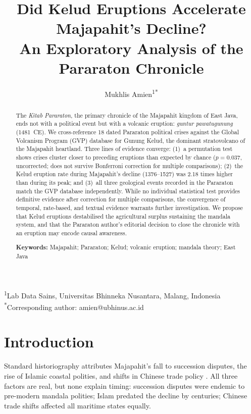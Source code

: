 \documentclass[12pt,a4paper]{article}
\title{\textbf{Did Kelud Eruptions Accelerate Majapahit's Decline?\\An Exploratory Analysis of the Pararaton Chronicle}}
\author{Mukhlis Amien\textsuperscript{1*}}
\date{}
\begin{document}
\maketitle

\noindent\textsuperscript{1}Lab Data Sains, Universitas Bhinneka Nusantara, Malang, Indonesia\\
\noindent\textsuperscript{*}Corresponding author: amien@ubhinus.ac.id

\begin{abstract}
The \textit{Kitab Pararaton}, the primary chronicle of the Majapahit kingdom of East Java, ends not with a political event but with a volcanic eruption: \textit{guntur pawatugunung} (1481~CE).
We cross-reference 18 dated Pararaton political crises against the Global Volcanism Program (GVP) database for Gunung Kelud, the dominant stratovolcano of the Majapahit heartland.
Three lines of evidence converge: (1)~a permutation test shows crises cluster closer to preceding eruptions than expected by chance ($p = 0.037$, uncorrected; does not survive Bonferroni correction for multiple comparisons); (2)~the Kelud eruption rate during Majapahit's decline (1376--1527) was 2.18 times higher than during its peak; and (3)~all three geological events recorded in the Pararaton match the GVP database independently.
While no individual statistical test provides definitive evidence after correction for multiple comparisons, the convergence of temporal, rate-based, and textual evidence warrants further investigation.
We propose that Kelud eruptions destabilised the agricultural surplus sustaining the mandala system, and that the Pararaton author's editorial decision to close the chronicle with an eruption may encode causal awareness.

\medskip\noindent\textbf{Keywords:} Majapahit; Pararaton; Kelud; volcanic eruption; mandala theory; East Java
\end{abstract}

\section{Introduction}

Standard historiography attributes Majapahit's fall to succession disputes, the rise of Islamic coastal polities, and shifts in Chinese trade policy \citep{ricklefs2001,reid1993}.
All three factors are real, but none explain timing: succession disputes were endemic to pre-modern mandala polities; Islam predated the decline by centuries; Chinese trade shifts affected all maritime states equally.
\end{document}
